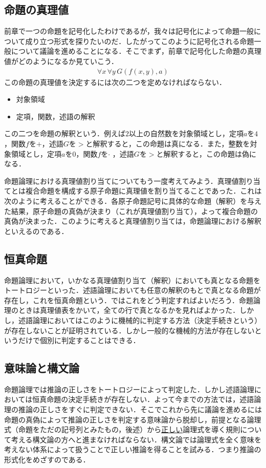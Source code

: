\documentclass[10pt,b5paper,papersize,dvipdfmx]{jsbook}
\begin{document}
\subsection{命題の真理値}
前章で一つの命題を記号化したわけであるが，我々は記号化によって命題一般について成り立つ形式を探りたいのだ．したがってこのように記号化される命題一般について議論を進めることになる．そこでまず，前章で記号化した命題の真理値がどのようになるか見ていこう．
\begin{align*}
  \forall x\, \forall y\, G(f(x,y),a)
\end{align*}
この命題の真理値を決定するには次の二つを定めなければならない．
\begin{itemize}
  \item 対象領域
  \item 定項，関数，述語の解釈
\end{itemize}
この二つを命題の解釈という．例えば$2$以上の自然数を対象領域とし，定項$a$を$4$，関数$f$を$+$，述語$G$を$>$と解釈すると，この命題は真になる．また，整数を対象領域とし，定項$a$を$0$，関数$f$を$\cdot$\,\,，述語$G$を$>$と解釈すると，この命題は偽になる． \par
命題論理における真理値割り当てについてもう一度考えてみよう．真理値割り当てとは複合命題を構成する原子命題に真理値を割り当てることであった．これは次のように考えることができる．各原子命題記号に具体的な命題（解釈）を与えた結果，原子命題の真偽が決まり（これが真理値割り当て），よって複合命題の真偽が決まった．このように考えると真理値割り当ては，命題論理における解釈といえるのである．

\subsection{恒真命題}
命題論理において，いかなる真理値割り当て（解釈）においても真となる命題をトートロジーといった．述語論理においても任意の解釈のもとで真となる命題が存在し，これを恒真命題という．ではこれをどう判定すればよいだろう．命題論理のときは真理値表をかいて，全ての行で真となるかを見ればよかった．しかし，述語論理においてはこのように機械的に判定する方法（決定手続きという）が存在しないことが証明されている．しかし一般的な機械的方法が存在しないというだけで個別に判定することはできる．

\subsection{意味論と構文論}
命題論理では推論の正しさをトートロジーによって判定した．しかし述語論理においては恒真命題の決定手続きが存在しない．よって今までの方法では，述語論理の推論の正しさをすぐに判定できない．そこでこれから先に議論を進めるには命題の真偽によって推論の正しさを判定する意味論から脱却し，前提となる論理式（命題をただの記号列とみたもの，後述）から\underline{正しい}論理式を導く規則について考える構文論の方へと進まなければならない．構文論では論理式を全く意味を考えない体系によって扱うことで正しい推論を得ることを試みる．つまり推論の形式化をめざすのである．
\end{document}
